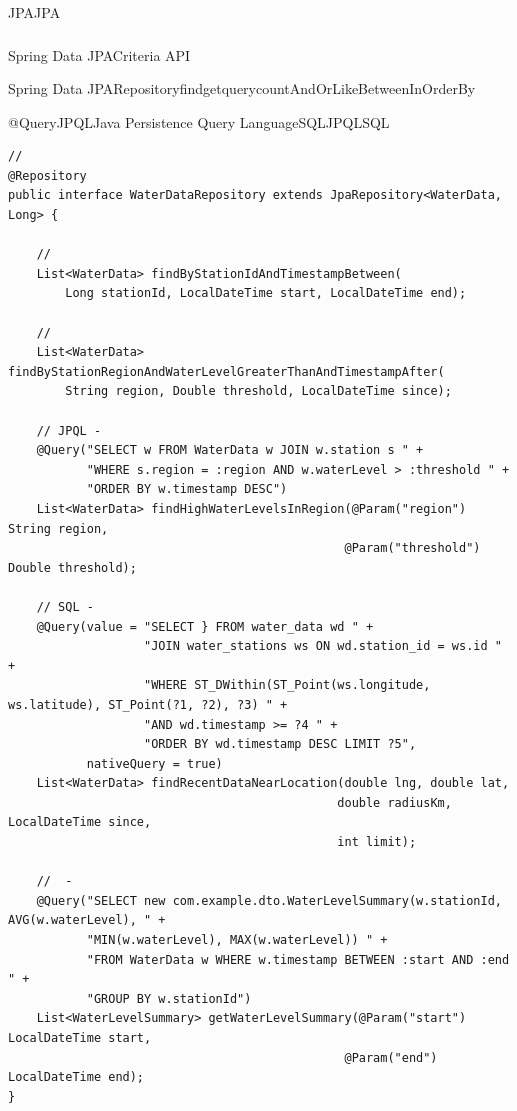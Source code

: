 \important{}JPAJPA

\hypertarget{section-61}{%
\subsubsection{}\label{section-61}}

Spring Data JPACriteria API

\important{}Spring Data
JPARepositoryfindgetquerycountAndOrLikeBetweenInOrderBy

@QueryJPQLJava Persistence Query LanguageSQLJPQLSQL

\begin{lstlisting}[style=java]
// 
@Repository
public interface WaterDataRepository extends JpaRepository<WaterData, Long> {
    
    // 
    List<WaterData> findByStationIdAndTimestampBetween(
        Long stationId, LocalDateTime start, LocalDateTime end);
    
    // 
    List<WaterData> findByStationRegionAndWaterLevelGreaterThanAndTimestampAfter(
        String region, Double threshold, LocalDateTime since);
    
    // JPQL - 
    @Query("SELECT w FROM WaterData w JOIN w.station s " +
           "WHERE s.region = :region AND w.waterLevel > :threshold " +
           "ORDER BY w.timestamp DESC")
    List<WaterData> findHighWaterLevelsInRegion(@Param("region") String region,
                                               @Param("threshold") Double threshold);
    
    // SQL - 
    @Query(value = "SELECT } FROM water_data wd " +
                   "JOIN water_stations ws ON wd.station_id = ws.id " +
                   "WHERE ST_DWithin(ST_Point(ws.longitude, ws.latitude), ST_Point(?1, ?2), ?3) " +
                   "AND wd.timestamp >= ?4 " +
                   "ORDER BY wd.timestamp DESC LIMIT ?5",
           nativeQuery = true)
    List<WaterData> findRecentDataNearLocation(double lng, double lat, 
                                              double radiusKm, LocalDateTime since, 
                                              int limit);
    
    //  - 
    @Query("SELECT new com.example.dto.WaterLevelSummary(w.stationId, AVG(w.waterLevel), " +
           "MIN(w.waterLevel), MAX(w.waterLevel)) " +
           "FROM WaterData w WHERE w.timestamp BETWEEN :start AND :end " +
           "GROUP BY w.stationId")
    List<WaterLevelSummary> getWaterLevelSummary(@Param("start") LocalDateTime start,
                                               @Param("end") LocalDateTime end);
}
\end{lstlisting}


